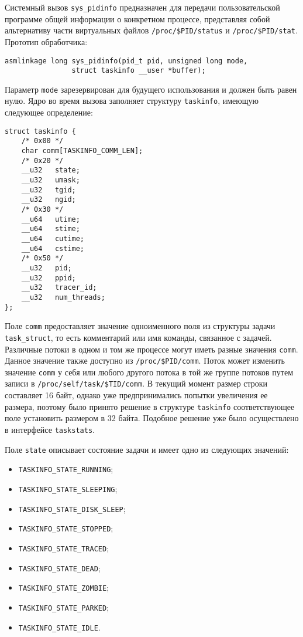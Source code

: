 Системный вызов \texttt{sys\_pidinfo} предназначен для передачи пользовательской
программе общей информации о конкретном процессе, представляя собой альтернативу
части виртуальных файлов \texttt{/proc/\$PID/status} и \texttt{/proc/\$PID/stat}. Прототип
обработчика:

\medskip
\begin{lstlisting}[style=cstyle]
asmlinkage long sys_pidinfo(pid_t pid, unsigned long mode,
			    struct taskinfo __user *buffer);
\end{lstlisting}
\medskip

Параметр \texttt{mode} зарезервирован для будущего использования и должен быть
равен нулю. Ядро во время вызова заполняет структуру \texttt{taskinfo}, имеющую
следующее определение:

\medskip
\begin{lstlisting}[style=cstyle]
struct taskinfo {
	/* 0x00 */
	char comm[TASKINFO_COMM_LEN];
	/* 0x20 */
	__u32	state;
	__u32	umask;
	__u32	tgid;
	__u32	ngid;
	/* 0x30 */
	__u64	utime;
	__u64	stime;
	__u64	cutime;
	__u64	cstime;
	/* 0x50 */
	__u32	pid;
	__u32	ppid;
	__u32	tracer_id;
	__u32	num_threads;
};
\end{lstlisting}
\medskip

Поле \texttt{comm} предоставляет значение одноименного поля из структуры задачи
\texttt{task\_struct}, то есть комментарий или имя команды, связанное с
задачей. Различные потоки в одном и том же процессе могут иметь разные значения
\texttt{comm}. Данное значение также доступно из
\texttt{/proc/\$PID/comm}. Поток может изменить значение \texttt{comm} у себя
или любого другого потока в той же группе потоков путем записи в
\texttt{/proc/self/task/\$TID/comm}. В текущий момент размер строки составляет
16 байт, однако уже предпринимались попытки увеличения ее размера, поэтому было
принято решение в структуре \texttt{taskinfo} соответствующее поле установить
размером в 32 байта. Подобное решение уже было осуществлено в интерфейсе
\texttt{taskstats}.

Поле \texttt{state} описывает состояние задачи и имеет одно из следующих
значений:
\begin{itemize}
\item \texttt{TASKINFO\_STATE\_RUNNING};
\item \texttt{TASKINFO\_STATE\_SLEEPING};
\item \texttt{TASKINFO\_STATE\_DISK\_SLEEP};
\item \texttt{TASKINFO\_STATE\_STOPPED};
\item \texttt{TASKINFO\_STATE\_TRACED};
\item \texttt{TASKINFO\_STATE\_DEAD};
\item \texttt{TASKINFO\_STATE\_ZOMBIE};
\item \texttt{TASKINFO\_STATE\_PARKED};
\item \texttt{TASKINFO\_STATE\_IDLE}.
\end{itemize}


